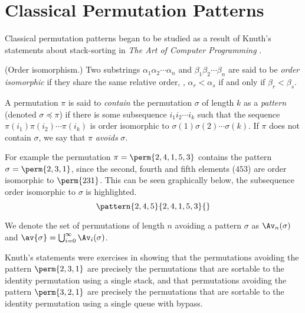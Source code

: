 \section{Classical Permutation Patterns}
Classical permutation patterns began to be studied as a result of Knuth's
statements about stack-sorting in \emph{The Art of Computer Programming}
\cite[p.~243, Ex.~5,6]{Knuth:1997:ACP:260999}.

\begin{definition}{(Order isomorphism.)}
    Two substrings \(\alpha_1\alpha_2\dotsm\alpha_n\) and
    \(\beta_1\beta_2\dotsm\beta_n\) are said to be \emph{order isomorphic}
    if they share the same relative order, \ie, \(\alpha_r<\alpha_s\) if and
    only if \(\beta_r<\beta_s\).
\end{definition}

A permutation \(\pi\) is said to \emph{contain} the permutation \(\sigma\) of
length \(k\) as a \emph{pattern} (denoted \(\sigma \preceq \pi\)) if there is some
subsequence \(i_1i_2\dotsm{}i_k\) such that the sequence
\(\pi(i_1)\pi(i_2)\dotsm\pi(i_k)\) is order isomorphic to
\(\sigma(1)\sigma(2)\dotsm\sigma(k)\). If \(\pi\) does not contain
\(\sigma\), we say that \(\pi\) \emph{avoids} \(\sigma\).

For example the permutation \(\pi = \perm{2,4,1,5,3}\) contains the pattern
\(\sigma = \perm{2,3,1}\), since the second, fourth and fifth elements
(\(453\)) are order isomorphic to \(\perm{231}\).
This can be seen graphically below, the subsequence order isomorphic to \(\sigma\)
is highlighted.
\begin{equation*}
    \pattern{2,4,5}{2,4,1,5,3}{}
\end{equation*}

We denote the set of permutations of length \(n\) avoiding a pattern \(\sigma\)
as \(\Av_n(\sigma)\) and \(\av{\sigma} = \bigcup_{i=0}^{\infty}\Av_i(\sigma)\).

Knuth's statements were exercises in showing that the permutations avoiding the
pattern \(\perm{2,3,1}\) are precisely the permutations that are sortable to
the identity permutation using a single stack, and that permutations avoiding the
pattern \(\perm{3,2,1}\) are precisely the permutations that are sortable to
the identity permutation using a single queue with bypass.

